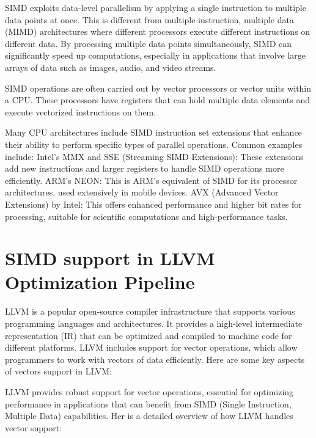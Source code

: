 SIMD exploits data-level parallelism by applying a single instruction
to multiple data points at once. This is different from multiple
instruction, multiple data (MIMD) architectures where different
processors execute different instructions on different data. By
processing multiple data points simultaneously, SIMD can significantly
speed up computations, especially in applications that involve large
arrays of data such as images, audio, and video streams.

SIMD operations are often carried out by vector processors or vector
units within a CPU. These processors have registers that can hold
multiple data elements and execute vectorized instructions on them.

Many CPU architectures include SIMD instruction set extensions that
enhance their ability to perform specific types of parallel
operations. Common examples include: Intel’s MMX and SSE (Streaming
SIMD Extensions): These extensions add new instructions and larger
registers to handle SIMD operations more efficiently. ARM’s NEON: This
is ARM’s equivalent of SIMD for its processor architectures, used
extensively in mobile devices. AVX (Advanced Vector Extensions) by
Intel: This offers enhanced performance and higher bit rates for
processing, suitable for scientific computations and high-performance
tasks.

\section{SIMD support in LLVM Optimization Pipeline}
\label{sec:llvm-vectors}

LLVM is a popular open-source compiler infrastructure that supports
various programming languages and architectures. It provides a
high-level intermediate representation (IR) that can be optimized and
compiled to machine code for different platforms. LLVM includes
support for vector operations, which allow programmers to work with
vectors of data efficiently. Here are some key aspects of vectors
support in LLVM:

LLVM provides robust support for vector operations, essential for
optimizing performance in applications that can benefit from SIMD
(Single Instruction, Multiple Data) capabilities. Her is a detailed
overview of how LLVM handles vector support:

